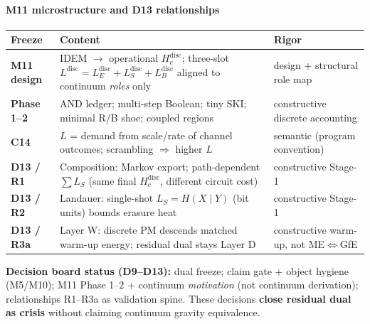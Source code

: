 \documentclass[
  11pt,
]{article}
\newcounter{none} %
\begin{document}
\paragraph{M11 microstructure and D13
relationships}\label{m11-microstructure-and-d13-relationships}

{\def\LTcaptype{none} %
\begin{longtable}[]{@{}
  >{\raggedright\arraybackslash}p{}
  >{\raggedright\arraybackslash}p{}
  >{\raggedright\arraybackslash}p{}@{}}
\toprule\noalign{}
\begin{minipage}[b]{\linewidth}\raggedright
Freeze
\end{minipage} & \begin{minipage}[b]{\linewidth}\raggedright
Content
\end{minipage} & \begin{minipage}[b]{\linewidth}\raggedright
Rigor
\end{minipage} \\
\midrule\noalign{}
\endhead
\bottomrule\noalign{}
\endlastfoot
\textbf{M11 design} & IDEM $\to$ operational \(H_c^{\mathrm{disc}}\);
three-slot
\(L^{\mathrm{disc}}=L_E^{\mathrm{disc}}+L_S^{\mathrm{disc}}+L_B^{\mathrm{disc}}\)
aligned to continuum \emph{roles} only & design + structural role map \\
\textbf{Phase 1--2} & AND ledger; multi-step Boolean; tiny SKI; minimal
R/B shoe; coupled regions & constructive discrete accounting \\
\textbf{C14} & \(L\) = demand from scale/rate of channel outcomes;
scrambling $\Rightarrow$ higher \(L\) & semantic (program convention) \\
\textbf{D13 / R1} & Composition: Markov export; path-dependent
\(\sum L_S\) (same final \(H_c^{\mathrm{disc}}\), different circuit
cost) & constructive Stage-1 \\
\textbf{D13 / R2} & Landauer: single-shot \(L_S=H(X\mid Y)\) (bit units)
bounds erasure heat & constructive Stage-1 \\
\textbf{D13 / R3a} & Layer W: discrete PM descends matched warm-up
energy; residual dual stays Layer D & constructive warm-up, not
ME$\Leftrightarrow$GfE \\
\end{longtable}
}

\textbf{Decision board status (D9--D13):} dual freeze; claim gate +
object hygiene (M5/M10); M11 Phase 1--2 + continuum \emph{motivation}
(not continuum derivation); relationships R1--R3a as validation spine.
These decisions \textbf{close residual dual as crisis} without claiming
continuum gravity equivalence.
\end{document}
